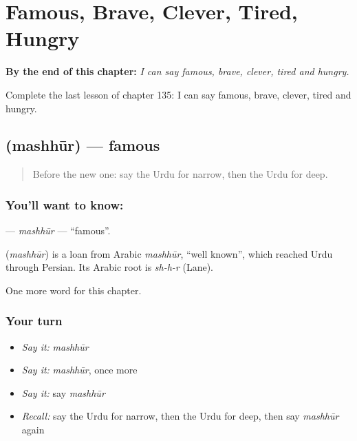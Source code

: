 
\chapter{Famous, Brave, Clever, Tired, Hungry}
\label{ch:ur-famous-brave-clever-tired-hungry}

\begin{chapteropening}
\textbf{By the end of this chapter:} \emph{I can say famous, brave, clever, tired and hungry.}

Complete the last lesson of chapter 135: I can say famous, brave, clever, tired and hungry.
\end{chapteropening}

\section[\texorpdfstring{\ur{مشہور} (mashhūr)}{مشہور (mashhūr)}]{ (mashhūr) — famous}

\label{lesson:UR-C135-mashhur}



\begin{quote}
Before the new one: say the Urdu for narrow, then the Urdu for deep.
\end{quote}

\subsection*{You'll want to know: }
\textbf{} — \emph{mashhūr} — \textquotedblleft{}famous\textquotedblright{}.

\begin{cousinweb}
\textbf{} (\emph{mashhūr}) is a loan from Arabic \emph{mashhūr}, \textquotedblleft{}well known\textquotedblright{}, which reached Urdu through Persian. Its Arabic root is \emph{sh-h-r} (Lane).
\end{cousinweb}

\begin{grammarlens}[title={What you've built}]
One more word for this chapter.
\end{grammarlens}

\subsection*{Your turn}
\begin{itemize}
\raggedright
  \item \emph{Say it:} \emph{mashhūr}
  \item \emph{Say it:} \emph{mashhūr}, once more
  \item \emph{Say it:} say \emph{mashhūr}
  \item \emph{Recall:} say the Urdu for narrow, then the Urdu for deep, then say \emph{mashhūr} again
\end{itemize}

